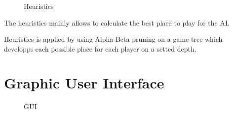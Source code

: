 \documentclass[12pt,a4paper,utf8x]{report}
\begin{document}
\begin{onehalfspace}
	\begin{figure}[h!]
		\centering
		\caption{Heuristics}
		\label{hrst} 
	\end{figure}
	
	The heuristics mainly allows to calculate the best place to play for the AI.
	
	Heuristics is applied by using Alpha-Beta pruning on a game tree which developps each possible place for each player on a setted depth.
	
	\clearpage
	
	\section{Graphic User Interface}
	
	\begin{figure}[h!]
		\centering
		\caption{GUI}
		\label{gui} 
	\end{figure}
	

\end{onehalfspace}
\end{document}
